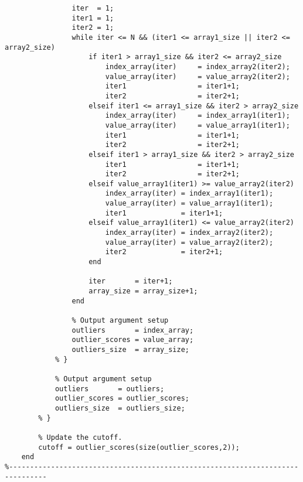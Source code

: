 \begin{lstlisting}
                iter  = 1;
                iter1 = 1;
                iter2 = 1;
                while iter <= N && (iter1 <= array1_size || iter2 <= array2_size)
                    if iter1 > array1_size && iter2 <= array2_size
                        index_array(iter)     = index_array2(iter2);
                        value_array(iter)     = value_array2(iter2);
                        iter1                 = iter1+1;
                        iter2                 = iter2+1;
                    elseif iter1 <= array1_size && iter2 > array2_size
                        index_array(iter)     = index_array1(iter1);
                        value_array(iter)     = value_array1(iter1);
                        iter1                 = iter1+1;
                        iter2                 = iter2+1;
                    elseif iter1 > array1_size && iter2 > array2_size
                        iter1                 = iter1+1;
                        iter2                 = iter2+1;
                    elseif value_array1(iter1) >= value_array2(iter2)
                        index_array(iter) = index_array1(iter1);
                        value_array(iter) = value_array1(iter1);
                        iter1             = iter1+1;
                    elseif value_array1(iter1) <= value_array2(iter2)
                        index_array(iter) = index_array2(iter2);
                        value_array(iter) = value_array2(iter2);
                        iter2             = iter2+1;
                    end

                    iter       = iter+1;
                    array_size = array_size+1;
                end

                % Output argument setup
                outliers       = index_array;
                outlier_scores = value_array;
                outliers_size  = array_size;
            % }

            % Output argument setup
            outliers       = outliers;
            outlier_scores = outlier_scores;
            outliers_size  = outliers_size;
        % }

        % Update the cutoff.
        cutoff = outlier_scores(size(outlier_scores,2));
    end
%-------------------------------------------------------------------------------
\end{lstlisting}
\lstset{language=Matlab}
